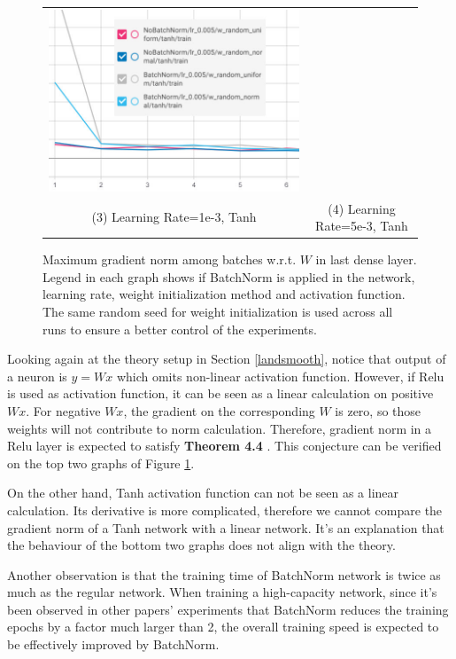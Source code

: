 \documentclass{article}
\begin{document}
\begin{figure}[h]
\begin{tabular}{cc}
  \includegraphics[scale=0.5]{pics/batchNorm/BatchNorm_tanh_5.jpg}\\
  (3) Learning Rate=1e-3, Tanh & (4) Learning Rate=5e-3, Tanh\\[6pt]
\end{tabular}
\caption{Maximum gradient norm among batches w.r.t. $W$ in last dense layer. Legend in each graph shows if BatchNorm is applied in the network, learning rate, weight initialization method and activation function. The same random seed for weight initialization is used across all runs to ensure a better control of the experiments.}
\label{fig:maxgradient}
\end{figure}

Looking again at the theory setup in Section \ref{landsmooth}, notice that output of a neuron is $y=Wx$ which omits non-linear activation function. However, if Relu is used as activation function, it can be seen as a linear calculation on positive $Wx$. For negative $Wx$, the gradient on the corresponding $W$ is zero, so those weights will not contribute to norm calculation. Therefore, gradient norm in a Relu layer is expected to satisfy \textbf{Theorem 4.4} . This conjecture can be verified on the top two graphs of Figure \ref{fig:maxgradient}. 

On the other hand, Tanh activation function can not be seen as a linear calculation. Its derivative is more complicated, therefore we cannot compare the gradient norm of a Tanh network with a linear network. It's an explanation that the behaviour of the bottom two graphs does not align with the theory.

Another observation is that the training time of BatchNorm network is twice as much as the regular network. When training a high-capacity network, since it's been observed in other papers' experiments that BatchNorm reduces the training epochs by a factor much larger than 2, the overall training speed is expected to be effectively improved by BatchNorm.
\end{document}

